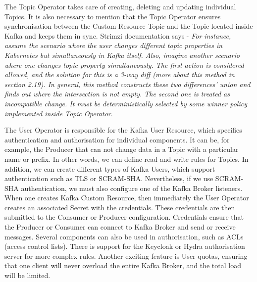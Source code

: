 The Topic Operator takes care of creating, deleting and updating individual Topics.
It is also necessary to mention that the Topic Operator ensures synchronisation between the Custom Resource Topic and the Topic located inside Kafka and keeps them in sync.
Strimzi documentation says - \emph{For instance, assume the scenario where the user changes different topic properties in Kubernetes
but simultaneously in Kafka itself. Also, imagine another scenario where one changes topic property simultaneously. The first action is considered allowed, and the solution for this is a 3-way diff (more about this method in section 2.19). In general, this method constructs these two differences' union and finds out where the intersection is not empty. The second one is treated as incompatible change. It must be deterministically selected by some winner policy implemented inside Topic Operator}.

The User Operator is responsible for the Kafka User Resource, which specifies authentication and authorisation for individual components.
It can be, for example, the Producer that can not change data in a Topic with a particular name or prefix.
In other words, we can define read and write rules for Topics.
In addition, we can create different types of Kafka Users, which support authentication such as TLS or SCRAM-SHA. Nevertheless, if we use SCRAM-SHA authentication, we must also configure one of the Kafka Broker listeners.
When one creates Kafka Custom Resource, then immediately the User Operator creates an associated Secret with the credentials.
These credentials are then submitted to the Consumer or Producer configuration.
Credentials ensure that the Producer or Consumer can connect to Kafka Broker and send or receive messages.
Several components can also be used in authorisation, such as ACLs (access control lists).
There is support for the Keycloak or Hydra authorisation server for more complex rules.
Another exciting feature is User quotas, ensuring that one client will never overload the entire Kafka Broker, and the total load will be limited.